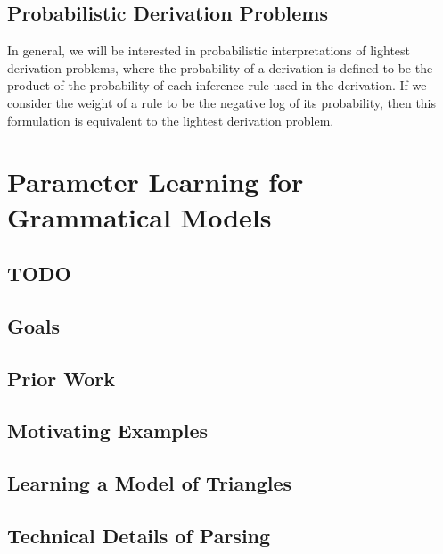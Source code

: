 \documentclass{tufte-book}
\begin{document}
% 
% 
% 



\section{Probabilistic Derivation Problems}


In general, we will be interested in probabilistic interpretations of
lightest derivation problems, where the probability of a derivation is
defined to be the product of the probability of each inference rule
used in the derivation. If we consider the weight of a rule to be the
negative log of its probability, then this formulation is equivalent
to the lightest derivation problem.



\chapter{Parameter Learning for Grammatical Models}

  \section{TODO}
      

  \section{Goals}
    

  \section{Prior Work}

  \section{Motivating Examples}

  \section{Learning a Model of Triangles}
    

  \section{Technical Details of Parsing}
\end{document}
